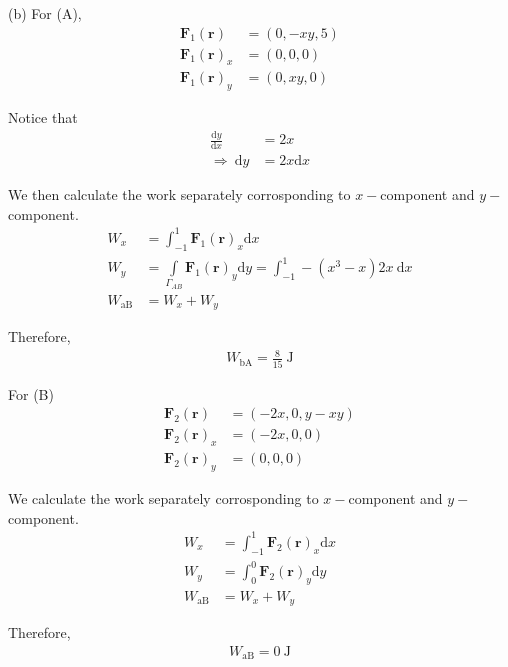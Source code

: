 \documentclass[12pt,a4paper]{article}
\begin{document}
\noindent (b) For (A),
\begin{align*}
	\textbf{F}_1 (\textbf{r}) &= (0,-xy,5)\\ 
	\textbf{F}_1 (\textbf{r})_x &= (0,0,0)\\
	\textbf{F}_1 (\textbf{r})_y &= (0,xy,0)
\end{align*}
\par Notice that
\begin{align}
	\frac{\text{d}y}{\text{d}x} &= 2x\\
\Rightarrow\ \text{d}y &= 2x\text{d}x
\end{align}
\par We then calculate the work separately corrosponding to $x-$component and $y-$component.
\begin{align}
	W_x &= \int_{-1}^{1} \textbf{F}_1 (\textbf{r})_x \text{d}x\\
	W_y &= \int\limits_{\Gamma_{AB}} \textbf{F}_1 (\textbf{r})_y \text{d}y = \int_{-1}^1 -(x^3-x) 2x\ \text{d}x\\
	W_{\text{aB}} &= W_x + W_y
\end{align}
\par Therefore,
\begin{align}
	W_{\text{bA}} = \frac{8}{15}\ \text{J}
\end{align}
\par For (B)
\begin{align*}
	\textbf{F}_2 (\textbf{r}) &= (-2x,0,y-xy)\\ 
	\textbf{F}_2 (\textbf{r})_x &= (-2x,0,0)\\
	\textbf{F}_2 (\textbf{r})_y &= (0,0,0)
\end{align*}
\par We calculate the work separately corrosponding to $x-$component and $y-$component.
\begin{align}
	W_x &= \int_{-1}^{1} \textbf{F}_2 (\textbf{r})_x \text{d}x\\
	W_y &= \int_0^0 \textbf{F}_2 (\textbf{r})_y \text{d}y\\
	W_{\text{aB}} &= W_x + W_y
\end{align}
\par Therefore,
\begin{align}
	W_{\text{aB}} = 0\ \text{J}
\end{align}
\end{document}
